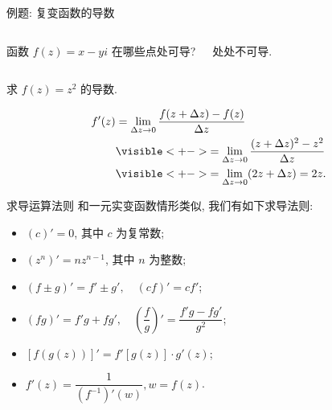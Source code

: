 \begin{frame}[<*>]{例题: 复变函数的导数}
\beqskip{4pt}
\onslide<+->
\begin{columns}
		\begin{exercise}
		函数 $f(z)=x-yi$ 在哪些点处可导? 
		\end{exercise}\onslide<+->
		\begin{answer}
		处处不可导.\\
		\vphantom{$f(z)=x-yi$ 在}
		\end{answer}
\end{columns}
\onslide<+->
\begin{example}
求 $f(z)=z^2$ 的导数.
\end{example}
\onslide<+->
\begin{solution}
\vspace{-\baselineskip}
\begin{align*}
f'(z)&=\lim_{\Delta z\to 0}\frac{f(z+\Delta z)-f(z)}{\Delta z}\\
&\visible<+->{=\lim_{\Delta z\to 0}\frac{(z+\Delta z)^2-z^2}{\Delta z}}\\
&\visible<+->{=\lim_{\Delta z\to 0}(2z+\Delta z)=2z.}
\end{align*}
\end{solution}
\endgroup
\end{frame}


\begin{frame}{求导运算法则}
\onslide<+->
和一元实变函数情形类似, 我们有如下求导法则:
\begin{theorem}
\begin{itemize}
\item $(c)'=0$, 其中 $c$ 为复常数;
\item $(z^n)'=nz^{n-1}$, 其中 $n$ 为整数;
\item $(f\pm g)'=f'\pm g',\quad (cf)'=cf'$;
\item $(fg)'=f'g+fg',\quad \left(\dfrac fg\right)'=\dfrac{f'g-fg'}{g^2}$;
\item $[f(g(z))]'=f'[g(z)]\cdot g'(z)$;
\item $f'(z)=\dfrac1{(f^{-1})'(w)}, w=f(z)$.
\end{itemize}
\end{theorem}
\end{frame}


